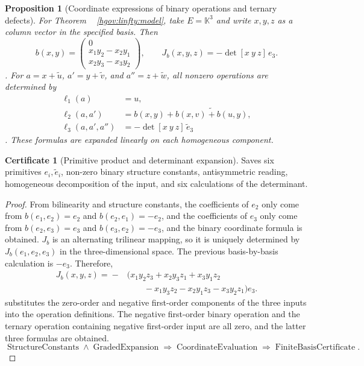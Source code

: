 \documentclass[12pt,a4paper,openany,notitlepage]{report}
\theoremstyle{plain}
\newtheorem{proposition}[theorem]{Proposition}
\theoremstyle{definition}
\newtheorem*{certificate}{Certificate}
\theoremstyle{remark}
\begin{document}
\begin{CJK*}
\begin{proposition}
[Coordinate expressions of binary operations and ternary defects]\label{exp:higher:coordinates}
For Theorem ~ \ref{hgov:linfty:model}, take $E=\mathbb K^3$ and write $x,y,z$ as a column vector in the specified basis. Then
\[
 b(x,y)=
 \begin{pmatrix}
 0\\x_1y_2-x_2y_1\\x_2y_3-x_3y_2
 \end{pmatrix},
 \qquad
 J_b(x,y,z)=-\det[x\ y\ z]\,e_3.
\].
For $a=x+\widetilde u$, $a'=y+\widetilde v$, and $a''=z+\widetilde w$, all nonzero operations are determined by
\[
 \begin{aligned}
 \ell_1(a)&=u,\\
 \ell_2(a,a')&=b(x,y)+\widetilde{b(x,v)+b(u,y)},\\
 \ell_3(a,a',a'')&=-\det[x\ y\ z]\,\widetilde e_3
 \end{aligned}
\].
These formulas are expanded linearly on each homogeneous component.\end{proposition}
\begin{certificate}
[Primitive product and determinant expansion]Saves six primitives $e_i,\widetilde e_i$, non-zero binary structure constants, antisymmetric reading, homogeneous decomposition of the input, and six calculations of the determinant.\end{certificate}
\begin{proof}
From bilinearity and structure constants, the coefficients of $e_2$ only come from $b(e_1,e_2)=e_2$ and $b(e_2,e_1)=-e_2$, and the coefficients of $e_3$ only come from $b(e_2,e_3)=e_3$ and $b(e_3,e_2)=-e_3$, and the binary coordinate formula is obtained. $J_b$ is an alternating trilinear mapping, so it is uniquely determined by $J_b(e_1,e_2,e_3)$ in the three-dimensional space. The previous basis-by-basis calculation is $-e_3$. Therefore, \[
 \begin{aligned}
 J_b(x,y,z)
 ={}-&\bigl(x_1y_2z_3+x_2y_3z_1+x_3y_1z_2\\
 &\qquad-x_1y_3z_2-x_2y_1z_3-x_3y_2z_1\bigr)e_3.
 \end{aligned}
\] substitutes the zero-order and negative first-order components of the three inputs into the operation definitions. The negative first-order binary operation and the ternary operation containing negative first-order input are all zero, and the latter three formulas are obtained. \[
 \operatorname{StructureConstants}\land\operatorname{GradedExpansion}
 \Rightarrow\operatorname{CoordinateEvaluation}
 \Rightarrow\operatorname{FiniteBasisCertificate}.
\]\end{proof}



\end{CJK*}
\end{document}
